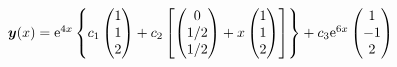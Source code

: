 {
$\boldsymbol{y}(x) = \mathrm{e}^{4x} \left\{ c_1 \begin{pmatrix}1\\1\\2\end{pmatrix}
    + c_2 \left[\begin{pmatrix}0\\1/2\\1/2\end{pmatrix} + x \begin{pmatrix}1\\ 1\\ 2\end{pmatrix} \right]
\right\}+ c_3 \mathrm{e}^{6x} \begin{pmatrix}1\\-1\\2\end{pmatrix}$
}


